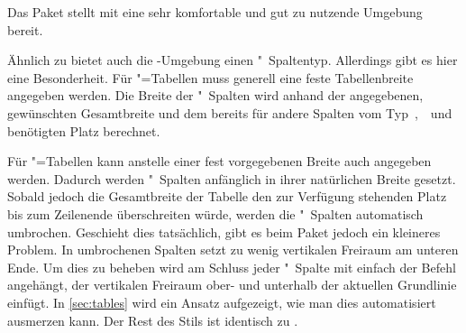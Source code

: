 \documentclass[%
  english,ngerman,%
  geometry=no,DIV=12,automark,%
]{tudscrartcl}
\begin{document}
Das Paket  stellt mit  eine sehr komfortable 
und gut zu nutzende Umgebung bereit. 

Ähnlich zu  bietet auch die -Umgebung 
einen "~Spaltentyp. Allerdings gibt es hier eine Besonderheit. Für 
"=Tabellen muss generell eine feste Tabellenbreite 
angegeben werden. Die Breite der "~Spalten wird anhand der 
angegebenen, gewünschten Gesamtbreite und dem bereits für andere Spalten vom 
Typ~,~~und~ benötigten Platz berechnet. 

Für "=Tabellen kann anstelle einer fest vorgegebenen Breite 
auch  angegeben werden. Dadurch werden "~Spalten 
anfänglich in ihrer natürlichen Breite gesetzt. Sobald jedoch die Gesamtbreite 
der Tabelle den zur Verfügung stehenden Platz bis zum Zeilenende überschreiten 
würde, werden die "~Spalten automatisch umbrochen. Geschieht dies 
tatsächlich, gibt es beim Paket  jedoch ein kleineres Problem. 
In umbrochenen Spalten setzt  zu wenig vertikalen Freiraum am 
unteren Ende. Um dies zu beheben wird am Schluss jeder "~Spalte mit
 einfach der Befehl  angehängt, der 
vertikalen Freiraum ober- und unterhalb der aktuellen Grundlinie einfügt. In 
\autoref{sec:tables} wird ein Ansatz aufgezeigt, wie man dies automatisiert 
ausmerzen kann. Der Rest des Stils ist identisch zu .
%
\InputHook{\let\newglossarystyle\renewglossarystyle}
\begin{Excerpt}
\end{Excerpt}
%
\begin{Excerpt*}
\printacronyms[style=acrotabu]
\end{Excerpt*}
\begin{quoting}[rightmargin=0pt]
\vspace*{-\baselineskip}
\glsdisablehyper
\InputExcerpt
\end{quoting}
\end{document}

